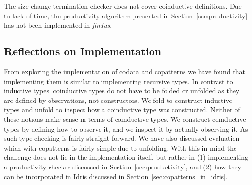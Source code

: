The size-change termination checker does not cover coinductive definitions. Due to lack of time, the productivity algorithm presented in Section~\ref{sec:productivity} has not been implemented in \textit{findus}.

\subsection{Reflections on Implementation}
From exploring the implementation of codata and copatterns we have found that implementing them is similar to implementing recursive types. In contrast to inductive types, coinductive types do not have to be folded or unfolded as they are defined by observations, not constructors. We fold to construct inductive types and unfold to inspect how a coinductive type was constructed. Neither of these notions make sense in terms of coinductive types. We construct coinductive types by defining how to observe it, and we inspect it by actually observing it. As such type checking is fairly straight-forward. We have also discussed evaluation which with copatterns is fairly simple due to unfolding. With this in mind the challenge does not lie in the implementation itself, but rather in (1) implementing a productivity checker discussed in Section~\ref{sec:productivity}, and (2) how they can be incorporated in Idris discussed in Section~\ref{sec:copatterns_in_idris}.
